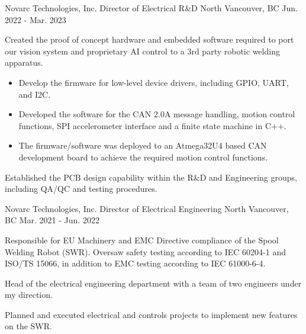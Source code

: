 \begin{cventries}
    \cventry
    {Novarc Technologies, Inc.} %
    {Director of Electrical R\&D} %
    {North Vancouver, BC} %
    {Jun. 2022 - Mar. 2023} %
    { %
        \begin{cvitems}
            \item {Created the proof of concept hardware and embedded software required to port our vision system and proprietary AI control to a 3rd party robotic
                        welding apparatus.}
            \begin{itemize}
                \item {Develop the firmware for low-level device drivers, including GPIO, UART, and I2C.}
                \item {Developed the software for the CAN 2.0A message handling, motion control functions, SPI accelerometer interface and a finite state machine in C++.}
                \item {The firmware/software was deployed to an Atmega32U4 based CAN development board to achieve the required motion control functions.}
            \end{itemize}
            \item {Established the PCB design capability within the R\&D and Engineering groups, including QA/QC and testing procedures.}
        \end{cvitems}
    }


    \cventry
    {Novarc Technologies, Inc.} %
    {Director of Electrical Engineering} %
    {North Vancouver, BC} %
    {Mar. 2021 - Jun. 2022} %
    { %
        \begin{cvitems}
            \item {Responsible for EU Machinery and EMC Directive compliance of the Spool Welding Robot (SWR). Oversaw safety testing according to IEC 60204-1 and ISO/TS 15066, in addition to EMC testing according to IEC 61000-6-4.}
            \item {Head of the electrical engineering department with a team of two engineers under my direction.}
            \item {Planned and executed electrical and controls projects to implement new features on the SWR.}
        \end{cvitems}
    }


\end{cventries}
